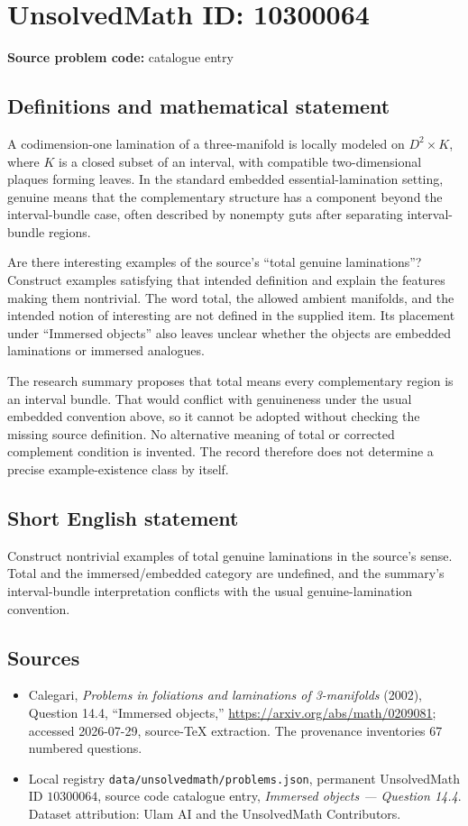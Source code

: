 \documentclass[11pt]{article}
\begin{document}
\section*{UnsolvedMath ID: 10300064}
\textbf{Source problem code:} catalogue entry
\subsection{Definitions and mathematical statement}
A codimension-one lamination of a three-manifold is locally modeled on $D^2\times K$, where $K$ is a closed subset of an interval, with compatible two-dimensional plaques forming leaves. In the standard embedded essential-lamination setting, genuine means that the complementary structure has a component beyond the interval-bundle case, often described by nonempty guts after separating interval-bundle regions.

Are there interesting examples of the source's ``total genuine laminations''? Construct examples satisfying that intended definition and explain the features making them nontrivial. The word total, the allowed ambient manifolds, and the intended notion of interesting are not defined in the supplied item. Its placement under ``Immersed objects'' also leaves unclear whether the objects are embedded laminations or immersed analogues.

The research summary proposes that total means every complementary region is an interval bundle. That would conflict with genuineness under the usual embedded convention above, so it cannot be adopted without checking the missing source definition. No alternative meaning of total or corrected complement condition is invented. The record therefore does not determine a precise example-existence class by itself.
\subsection{Short English statement}
Construct nontrivial examples of total genuine laminations in the source's sense. Total and the immersed/embedded category are undefined, and the summary's interval-bundle interpretation conflicts with the usual genuine-lamination convention.
\subsection{Sources}
\begin{itemize}
\item Calegari, \emph{Problems in foliations and laminations of 3-manifolds} (2002), Question 14.4, ``Immersed objects,'' \url{https://arxiv.org/abs/math/0209081}; accessed 2026-07-29, source-TeX extraction. The provenance inventories 67 numbered questions.
\item Local registry \texttt{data/unsolvedmath/problems.json}, permanent UnsolvedMath ID $10300064$, source code catalogue entry, \emph{Immersed objects --- Question 14.4}. Dataset attribution: Ulam AI and the UnsolvedMath Contributors.
\end{itemize}
\end{document}
